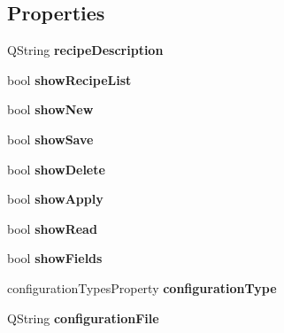 \subsection*{Properties}
\begin{DoxyCompactItemize}
\item 
\hypertarget{classQERecipe_adcdeb9b11b909c6cb6ab60ee2fd454d3}{
QString {\bfseries recipeDescription}}
\label{classQERecipe_adcdeb9b11b909c6cb6ab60ee2fd454d3}

\item 
\hypertarget{classQERecipe_afe18cf7f390d53bcd5fe8dc4daa57942}{
bool {\bfseries showRecipeList}}
\label{classQERecipe_afe18cf7f390d53bcd5fe8dc4daa57942}

\item 
\hypertarget{classQERecipe_a62fe76525c1c4bcd0cd675cf26b0279a}{
bool {\bfseries showNew}}
\label{classQERecipe_a62fe76525c1c4bcd0cd675cf26b0279a}

\item 
\hypertarget{classQERecipe_afbb211467ee38836e741d542a42211cf}{
bool {\bfseries showSave}}
\label{classQERecipe_afbb211467ee38836e741d542a42211cf}

\item 
\hypertarget{classQERecipe_a3ea6ae00b2a500c73fee4d80498b6a7e}{
bool {\bfseries showDelete}}
\label{classQERecipe_a3ea6ae00b2a500c73fee4d80498b6a7e}

\item 
\hypertarget{classQERecipe_a34f9dff67f61b47a26ed8e523ee0295d}{
bool {\bfseries showApply}}
\label{classQERecipe_a34f9dff67f61b47a26ed8e523ee0295d}

\item 
\hypertarget{classQERecipe_a1af6648ea5aad88a0ea506281c3a8a0e}{
bool {\bfseries showRead}}
\label{classQERecipe_a1af6648ea5aad88a0ea506281c3a8a0e}

\item 
\hypertarget{classQERecipe_a99c32d3f3920dff3fb4ab53627afdd76}{
bool {\bfseries showFields}}
\label{classQERecipe_a99c32d3f3920dff3fb4ab53627afdd76}

\item 
\hypertarget{classQERecipe_a3359530ec2869f8cb34000380ac6b099}{
configurationTypesProperty {\bfseries configurationType}}
\label{classQERecipe_a3359530ec2869f8cb34000380ac6b099}

\item 
\hypertarget{classQERecipe_a2de1cfbf24833ecd0c8a62f8e9e8fc7c}{
QString {\bfseries configurationFile}}
\label{classQERecipe_a2de1cfbf24833ecd0c8a62f8e9e8fc7c}


\end{DoxyCompactItemize}
